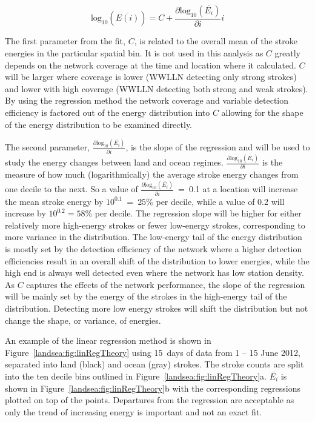 \begin{equation}
\text{log}_{10}(\overline{E(i)}) = C + \frac{\partial \text{log}_{10}(\overline{E_i})}{\partial i} i
\end{equation}

The first parameter from the fit, $C$, is related to the overall mean of the stroke energies in the particular spatial bin.
It is not used in this analysis as $C$ greatly depends on the network coverage at the time and location where it calculated.
$C$ will be larger where coverage is lower (WWLLN detecting only strong strokes) and lower with high coverage (WWLLN detecting both strong and weak strokes).
By using the regression method the network coverage and variable detection efficiency is factored out of the energy distribution into $C$ allowing for the shape of the energy distribution to be examined directly.

The second parameter, $\frac{\partial \text{log}_{10}(\overline{E_i})}{\partial i}$, is the slope of the regression and will be used to study the energy changes between land and ocean regimes.
$\frac{\partial \text{log}_{10}(\overline{E_i})}{\partial i}$ is the measure of how much (logarithmically) the average stroke energy changes from one decile to the next.
So a value of $\frac{\partial \text{log}_{10}(\overline{E_i})}{\partial i}$~=~0.1 at a location will increase the mean stroke energy by $10^{0.1}~=~25\%$ per decile, while a value of 0.2 will increase by $10^{0.2} = 58\%$ per decile.
The regression slope will be higher for either relatively more high-energy strokes or fewer low-energy strokes, corresponding to more variance in the distribution.
The low-energy tail of the energy distribution is mostly set by the detection efficiency of the network where a higher detection efficiencies result in an overall shift of the distribution to lower energies, while the high end is always well detected even where the network has low station density.
As $C$ captures the effects of the network performance, the slope of the regression will be mainly set by the energy of the strokes in the high-energy tail of the distribution.
Detecting more low energy strokes will shift the distribution but not change the shape, or variance, of energies.

An example of the linear regression method is shown in Figure~\ref{landsea:fig:linRegTheory} using 15~days of data from 1 -- 15 June 2012, separated into land (black) and ocean (gray) strokes.
The stroke counts are split into the ten decile bins outlined in Figure~\ref{landsea:fig:linRegTheory}a.
$\overline{E_i}$ is shown in Figure~\ref{landsea:fig:linRegTheory}b with the corresponding regressions plotted on top of the points.
Departures from the regression are acceptable as only the trend of increasing energy is important and not an exact fit.

